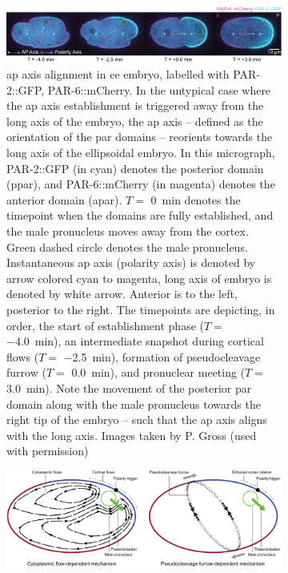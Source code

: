 \begin{figure}

\centering
\begin{subfigure}{\textwidth}
    \centering
    \includegraphics[width=\textwidth]{Introduction/FigureApAxisAlignment/micrograph.pdf}
    \caption{\acs{ap} axis alignment in \acs{ce} embryo, labelled with PAR-2::GFP, PAR-6::mCherry. In the untypical case where the \acs{ap} axis establishment is triggered away from the long axis of the embryo, the \acs{ap} axis -- defined as the orientation of the \acs{par} domains -- reorients towards the long axis of the ellipsoidal embryo. In this micrograph, PAR-2::GFP (in cyan) denotes the posterior domain (\acs{ppar}), and PAR-6::mCherry (in magenta) denotes the anterior domain (\acs{apar}). $T = $ \SI{0}{\minute} denotes the timepoint when the domains are fully established, and the male pronucleus moves away from the cortex. Green dashed circle denotes the male pronucleus. Instantaneous \acs{ap} axis (polarity axis) is denoted by arrow colored cyan to magenta, long axis of embryo is denoted by white arrow. Anterior is to the left, posterior to the right. The timepoints are depicting, in order, the start of establishment phase ($T = $ \SI{-4.0}{\minute}), an intermediate snapshot during cortical flows ($T = $ \SI{-2.5}{\minute}), formation of pseudocleavage furrow ($T = $ \SI{0.0}{\minute}), and pronuclear meeting ($T = $ \SI{3.0}{\minute}). Note the movement of the posterior \acs{par} domain along with the male pronucleus towards the right tip of the embryo -- such that the \acs{ap} axis aligns with the long axis. Images taken by P. Gross (used with permission)} 
    \label{subfig:apAxisAlignment-micrograph}
\end{subfigure}
\hfill
\begin{subfigure}{\textwidth}
    \centering
    \includegraphics[width=\textwidth]{Introduction/FigureApAxisAlignment/mechanisms.pdf}

\end{subfigure}
\end{figure}
